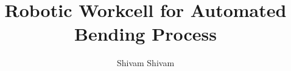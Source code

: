 \documentclass{article}
\begin{document}
\title{Robotic Workcell for Automated Bending Process}

\author{Shivam Shivam}

\maketitle
























\end{document}
